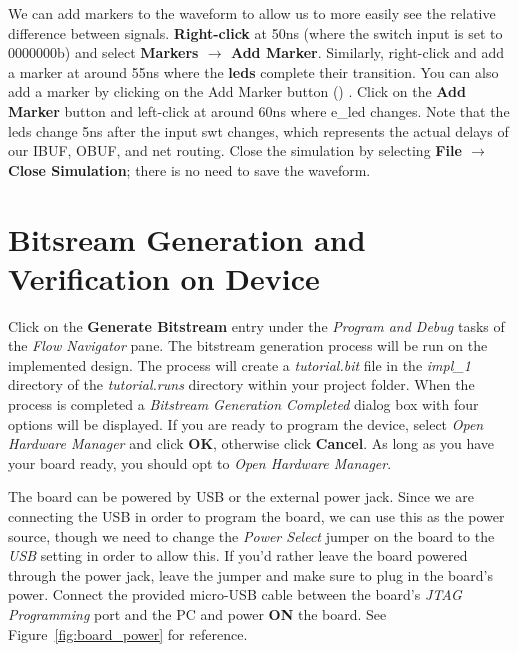 \documentclass[11pt]{article}
\begin{document}
We can add markers to the waveform to allow us to more easily see the relative difference between signals. \textbf{Right-click} at 50ns (where the switch input is set to 0000000b) and select \textbf{Markers $\rightarrow$ Add Marker}. Similarly, right-click and add a marker at around 55ns where the \textbf{leds} complete their transition. You can also add a marker by clicking on the Add Marker button 
()
. Click on the \textbf{Add Marker} button and left-click at around 60ns where e\_led changes. Note that the leds change 5ns after the input swt changes, which represents the actual delays of our IBUF, OBUF, and net routing. Close the simulation by selecting \textbf{File $\rightarrow$ Close Simulation}; there is no need to save the waveform.




\section{Bitsream Generation and Verification on Device}
\label{sec:bitgen}
Click on the \textbf{Generate Bitstream} entry under the \textit{Program and Debug} tasks of the \textit{Flow Navigator} pane. The bitstream generation process will be run on the implemented design. The process will create a \textit{tutorial.bit} file in the \textit{impl\_1} directory of the \textit{tutorial.runs} directory within your project folder. When the process is completed a \textit{Bitstream Generation Completed} dialog box with four options will be displayed. If you are ready to program the device, select \textit{Open Hardware Manager} and click \textbf{OK}, otherwise click \textbf{Cancel}. As long as you have your board ready, you should opt to \textit{Open Hardware Manager}.

The board can be powered by USB or the external power jack. Since we are connecting the USB in order to program the board, we can use this as the power source, though we need to change the \textit{Power Select} jumper on the board to the \textit{USB} setting in order to allow this. If you'd rather leave the board powered through the power jack, leave the jumper and make sure to plug in the board's power. Connect the provided micro-USB cable between the board's \textit{JTAG Programming} port and the PC and power \textbf{ON} the board. See Figure~\ref{fig:board_power} for reference.
\end{document}
